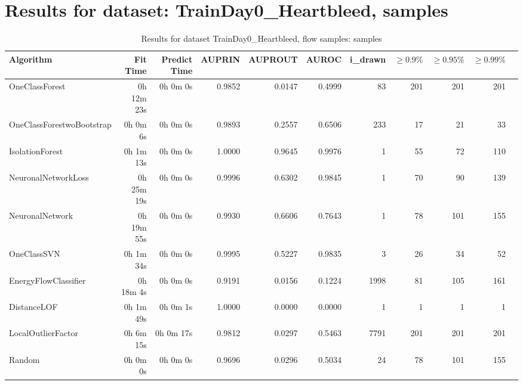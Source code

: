 \documentclass{article}
\begin{document}
\section*{Results for dataset: TrainDay0_Heartbleed, samples}
\begin{table}[h!]
\centering
\caption{Results for dataset TrainDay0_Heartbleed, flow samples: samples}
\begin{tabular}{lrrrrrrrrrr}
\toprule
Algorithm & Fit Time & Predict Time & AUPRIN & AUPROUT & AUROC & i\_drawn & $\geq 0.9\%$ & $\geq 0.95\%$ & $\geq 0.99\%$ \\
\midrule
OneClassForest & 0h 12m 23s & 0h 0m 0s & 0.9852 & 0.0147 & 0.4999 & 83 & 201 & 201 & 201 \\
OneClassForestwoBootstrap & 0h 0m 6s & 0h 0m 0s & 0.9893 & 0.2557 & 0.6506 & 233 & 17 & 21 & 33 \\
IsolationForest & 0h 1m 13s & 0h 0m 0s & 1.0000 & 0.9645 & 0.9976 & 1 & 55 & 72 & 110 \\
NeuronalNetworkLoss & 0h 25m 19s & 0h 0m 0s & 0.9996 & 0.6302 & 0.9845 & 1 & 70 & 90 & 139 \\
NeuronalNetwork & 0h 19m 55s & 0h 0m 0s & 0.9930 & 0.6606 & 0.7643 & 1 & 78 & 101 & 155 \\
OneClassSVN & 0h 1m 34s & 0h 0m 0s & 0.9995 & 0.5227 & 0.9835 & 3 & 26 & 34 & 52 \\
EnergyFlowClassifier & 0h 18m 4s & 0h 0m 0s & 0.9191 & 0.0156 & 0.1224 & 1998 & 81 & 105 & 161 \\
DistanceLOF & 0h 1m 49s & 0h 0m 1s & 1.0000 & 0.0000 & 0.0000 & 1 & 1 & 1 & 1 \\
LocalOutlierFactor & 0h 6m 15s & 0h 0m 17s & 0.9812 & 0.0297 & 0.5463 & 7791 & 201 & 201 & 201 \\
Random & 0h 0m 0s & 0h 0m 0s & 0.9696 & 0.0296 & 0.5034 & 24 & 78 & 101 & 155 \\
\bottomrule
\end{tabular}
\end{table}
\end{document}
